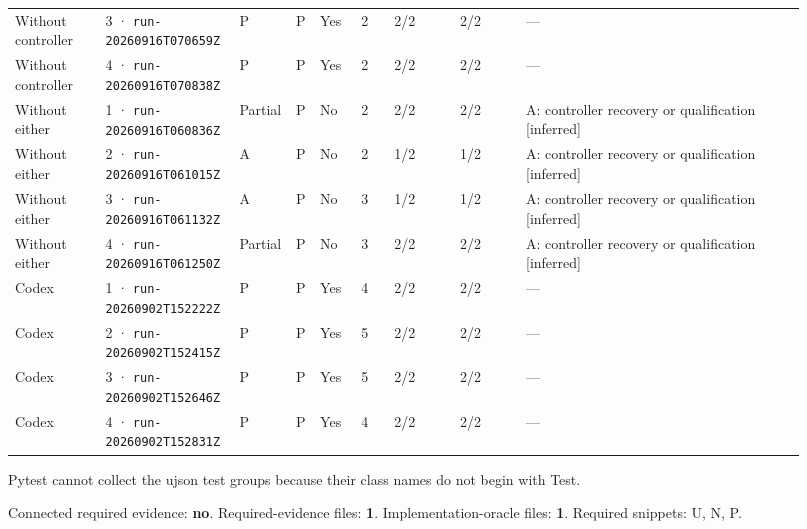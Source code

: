 \begin{landscape}
\begin{longtable}{@{}L{0.11\linewidth}L{0.16\linewidth}*{2}{L{0.022\linewidth}}L{0.05\linewidth}L{0.045\linewidth}L{0.08\linewidth}L{0.085\linewidth}L{0.346\linewidth}@{}}
Without controller & 3 · \texttt{run-20260916\allowbreak T070659Z} & P & P & Yes & 2 & 2/2 & 2/2 & --- \\
Without controller & 4 · \texttt{run-20260916\allowbreak T070838Z} & P & P & Yes & 2 & 2/2 & 2/2 & --- \\
Without either & 1 · \texttt{run-20260916\allowbreak T060836Z} & Partial & P & No & 2 & 2/2 & 2/2 & A: controller recovery or qualification [inferred] \\
Without either & 2 · \texttt{run-20260916\allowbreak T061015Z} & A & P & No & 2 & 1/2 & 1/2 & A: controller recovery or qualification [inferred] \\
Without either & 3 · \texttt{run-20260916\allowbreak T061132Z} & A & P & No & 3 & 1/2 & 1/2 & A: controller recovery or qualification [inferred] \\
Without either & 4 · \texttt{run-20260916\allowbreak T061250Z} & Partial & P & No & 3 & 2/2 & 2/2 & A: controller recovery or qualification [inferred] \\
Codex & 1 · \texttt{run-20260902\allowbreak T152222Z} & P & P & Yes & 4 & 2/2 & 2/2 & --- \\
Codex & 2 · \texttt{run-20260902\allowbreak T152415Z} & P & P & Yes & 5 & 2/2 & 2/2 & --- \\
Codex & 3 · \texttt{run-20260902\allowbreak T152646Z} & P & P & Yes & 5 & 2/2 & 2/2 & --- \\
Codex & 4 · \texttt{run-20260902\allowbreak T152831Z} & P & P & Yes & 4 & 2/2 & 2/2 & --- \\
\end{longtable}
\endgroup
\end{landscape}

\label{sec:pandas-dev-pandas-16499}

Pytest cannot collect the ujson test groups because their class names do not begin with Test.

Connected required evidence: \textbf{no}. Required-evidence files: \textbf{1}. Implementation-oracle files: \textbf{1}. Required snippets: U, N, P.

